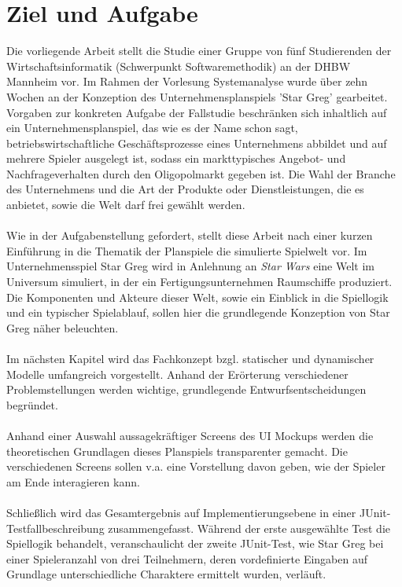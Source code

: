 \section{Ziel und Aufgabe}
\label{sec:einleitung-ziel}

Die vorliegende Arbeit stellt die Studie einer Gruppe von fünf Studierenden der Wirtschaftsinformatik (Schwerpunkt Softwaremethodik) an der DHBW Mannheim vor. Im Rahmen der Vorlesung Systemanalyse wurde über zehn Wochen an der Konzeption des Unternehmensplanspiels 'Star Greg' gearbeitet. Vorgaben zur konkreten Aufgabe der Fallstudie beschränken sich inhaltlich auf ein Unternehmensplanspiel, das wie es der Name schon sagt, betriebswirtschaftliche Geschäftsprozesse eines Unternehmens abbildet und auf mehrere Spieler ausgelegt ist, sodass ein markttypisches Angebot- und Nachfrageverhalten durch den Oligopolmarkt gegeben ist. Die Wahl der Branche des Unternehmens und die Art der Produkte oder Dienstleistungen, die es anbietet, sowie die Welt darf frei gewählt werden. 
\\
\\
Wie in der Aufgabenstellung gefordert, stellt diese Arbeit nach einer kurzen Einführung in die Thematik der Planspiele die simulierte Spielwelt vor. Im Unternehmensspiel Star Greg wird in Anlehnung an \textit{Star Wars} eine Welt im Universum simuliert, in der ein Fertigungsunternehmen Raumschiffe produziert. Die Komponenten und Akteure dieser Welt, sowie ein Einblick in die Spiellogik und ein typischer Spielablauf, sollen hier die grundlegende Konzeption von Star Greg näher beleuchten.  
\\
\\
Im nächsten Kapitel wird das Fachkonzept bzgl. statischer und dynamischer Modelle umfangreich vorgestellt. Anhand der Erörterung verschiedener Problemstellungen werden wichtige, grundlegende Entwurfsentscheidungen begründet.
\\
\\
Anhand einer Auswahl aussagekräftiger Screens des UI Mockups werden die theoretischen Grundlagen dieses Planspiels transparenter gemacht. Die verschiedenen Screens sollen v.a. eine Vorstellung davon geben, wie der Spieler am Ende interagieren kann. 
\\
\\
Schließlich wird das Gesamtergebnis auf Implementierungsebene in einer  JUnit-Testfallbeschreibung zusammengefasst. Während der erste ausgewählte Test die Spiellogik behandelt, veranschaulicht der zweite JUnit-Test, wie Star Greg bei einer Spieleranzahl von drei Teilnehmern, deren vordefinierte Eingaben auf Grundlage unterschiedliche Charaktere ermittelt wurden, verläuft. 


